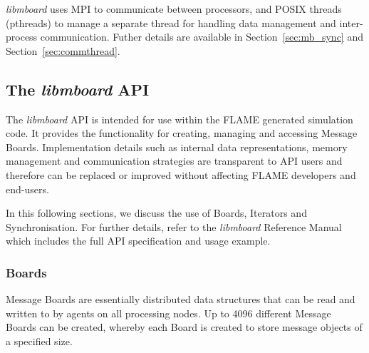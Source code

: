 \textit{libmboard} uses MPI to communicate between processors, and POSIX threads (pthreads) to manage a separate thread for handling data management and inter-process communication. Futher details are available in Section~\ref{sec:mb_sync} and Section~\ref{sec:commthread}.

\subsection{The \textit{libmboard} API}
\label{sec:mb_api}

The  \textit{libmboard} API is intended for use within the FLAME generated simulation code. It provides the functionality for creating, managing and accessing Message Boards. Implementation details such as internal data representations, memory management and communication strategies are transparent to API users and therefore can be replaced or improved without affecting FLAME developers and end-users.

In this following sections, we discuss the use of Boards, Iterators and Synchronisation. For further details, refer to the \textit{libmboard} Reference Manual\cite{MessageBoardAPI} which includes the full API specification and usage example.


\subsubsection{Boards}

Message Boards are essentially distributed data structures that can be read and written to by agents on all processing nodes. Up to 4096 different Message Boards can be created, whereby each Board is created to store message objects of a specified size.

